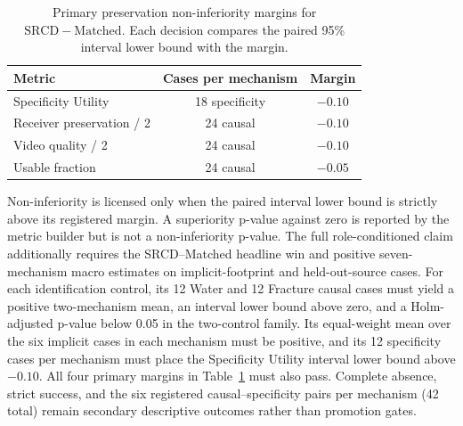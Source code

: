 \begin{table}[H]
  \centering
  \caption{Primary preservation non-inferiority margins for
  \(\mathrm{SRCD}-\mathrm{Matched}\).  Each decision compares the paired 95\%
  interval lower bound with the margin.}
  \label{tab:noninferiority-margins}
  \small
  \begin{tabular}{@{}lcc@{}}
    \toprule
    Metric & Cases per mechanism & Margin \\
    \midrule
    Specificity Utility & 18 specificity & \(-0.10\) \\
    Receiver preservation / 2 & 24 causal & \(-0.10\) \\
    Video quality / 2 & 24 causal & \(-0.10\) \\
    Usable fraction & 24 causal & \(-0.05\) \\
    \bottomrule
  \end{tabular}
\end{table}

Non-inferiority is licensed only when the paired interval lower bound is
strictly above its registered margin.  A superiority p-value against zero is
reported by the metric builder but is not a non-inferiority p-value.  The full
role-conditioned claim additionally requires the SRCD--Matched headline win
and positive seven-mechanism macro estimates on implicit-footprint and
held-out-source cases.  For each identification control, its 12 Water and 12
Fracture causal cases must yield a positive two-mechanism mean, an interval
lower bound above zero, and a Holm-adjusted p-value below 0.05 in the
two-control family.  Its equal-weight mean over the six implicit cases in each
mechanism must be positive, and its 12 specificity cases per mechanism must
place the Specificity Utility interval lower bound above \(-0.10\).  All four
primary margins in Table~\ref{tab:noninferiority-margins} must also pass.
Complete absence, strict success, and the six registered causal--specificity
pairs per mechanism (42 total) remain secondary descriptive outcomes rather
than promotion gates.
